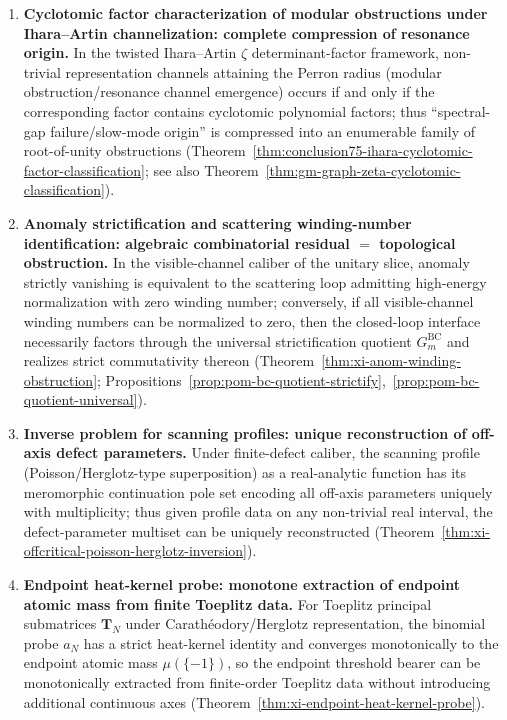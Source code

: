 \begin{enumerate}
  \item \textbf{Cyclotomic factor characterization of modular obstructions under Ihara--Artin channelization: complete compression of resonance origin.}
  In the twisted Ihara--Artin \(\zeta\) determinant-factor framework, non-trivial representation channels attaining the Perron radius (modular obstruction/resonance channel emergence) occurs if and only if the corresponding factor contains cyclotomic polynomial factors; thus ``spectral-gap failure/slow-mode origin'' is compressed into an enumerable family of root-of-unity obstructions (Theorem~\ref{thm:conclusion75-ihara-cyclotomic-factor-classification}; see also Theorem~\ref{thm:gm-graph-zeta-cyclotomic-classification}).

  \item \textbf{Anomaly strictification and scattering winding-number identification: algebraic combinatorial residual \(=\) topological obstruction.}
  In the visible-channel caliber of the unitary slice, anomaly strictly vanishing is equivalent to the scattering loop admitting high-energy normalization with zero winding number; conversely, if all visible-channel winding numbers can be normalized to zero, then the closed-loop interface necessarily factors through the universal strictification quotient \(G^{\mathrm{BC}}_m\) and realizes strict commutativity thereon (Theorem~\ref{thm:xi-anom-winding-obstruction}; Propositions~\ref{prop:pom-bc-quotient-strictify},~\ref{prop:pom-bc-quotient-universal}).

  \item \textbf{Inverse problem for scanning profiles: unique reconstruction of off-axis defect parameters.}
  Under finite-defect caliber, the scanning profile (Poisson/Herglotz-type superposition) as a real-analytic function has its meromorphic continuation pole set encoding all off-axis parameters uniquely with multiplicity; thus given profile data on any non-trivial real interval, the defect-parameter multiset can be uniquely reconstructed (Theorem~\ref{thm:xi-offcritical-poisson-herglotz-inversion}).

  \item \textbf{Endpoint heat-kernel probe: monotone extraction of endpoint atomic mass from finite Toeplitz data.}
  For Toeplitz principal submatrices \(\mathbf{T}_N\) under Carath\'eodory/Herglotz representation, the binomial probe \(a_N\) has a strict heat-kernel identity and converges monotonically to the endpoint atomic mass \(\mu(\{-1\})\), so the endpoint threshold bearer can be monotonically extracted from finite-order Toeplitz data without introducing additional continuous axes (Theorem~\ref{thm:xi-endpoint-heat-kernel-probe}).


\end{enumerate}
